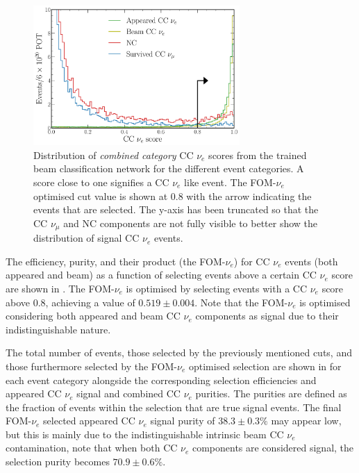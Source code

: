 \begin{figure} %
    \includegraphics[width=0.7\textwidth]{diagrams/7-results/final_beam_nuel_outputs.pdf}
    \caption[Distribution of CC $\nu_{e}$ scores from the trained beam classification network]
    {Distribution of \emph{combined category} CC $\nu_{e}$ scores from the trained beam
        classification network for the different event categories. A score close to one signifies
        a CC $\nu_{e}$ like event. The FOM-$\nu_e$ optimised cut value is shown at $0.8$ with the
        arrow indicating the events that are selected. The y-axis has been truncated so that the
        CC $\nu_{\mu}$ and NC components are not fully visible to better show the distribution of
        signal CC $\nu_{e}$ events.}
    \label{fig:final_beam_nuel_outputs}
\end{figure}

The efficiency, purity, and their product (the FOM-$\nu_e$) for CC $\nu_{e}$ events (both appeared
and beam) as a function of selecting events above a certain CC $\nu_{e}$ score are shown in
. The FOM-$\nu_e$ is optimised by selecting events with a CC
$\nu_{e}$ score above $0.8$, achieving a value of $0.519\pm0.004$. Note that the FOM-$\nu_e$ is
optimised considering both appeared and beam CC $\nu_{e}$ components as signal due to their
indistinguishable nature.

The total number of events, those selected by the previously mentioned cuts, and those furthermore
selected by the FOM-$\nu_e$ optimised selection are shown in  for
each event category alongside the corresponding selection efficiencies and appeared CC $\nu_{e}$
signal and combined CC $\nu_{e}$ purities. The purities are defined as the fraction of events
within the selection that are true signal events. The final FOM-$\nu_e$ selected appeared CC
$\nu_{e}$ signal purity of $38.3\pm0.3\%$ may appear low, but this is mainly due to the
indistinguishable intrinsic beam CC $\nu_{e}$ contamination, note that when both CC $\nu_{e}$
components are considered signal, the selection purity becomes $70.9\pm0.6\%$.

